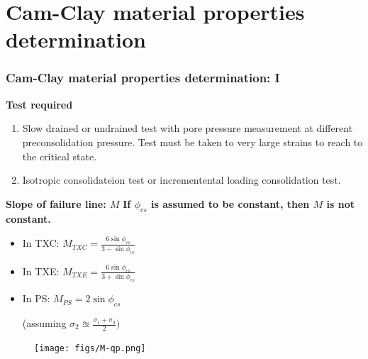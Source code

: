 \documentclass[notes]{beamer}
\begin{document}
\section{Cam-Clay material properties determination}
\begin{frame}
\frametitle{Cam-Clay material properties determination: I}
\textbf{Test required}
\begin{enumerate}
	\item Slow drained or undrained test with pore pressure measurement at different preconsolidation pressure. Test must be taken to very large strains to reach to the critical state.
	\item Isotropic consolidateion test or incrementental loading consolidation test.
\end{enumerate}


\noindent
\fboxsep=0pt
\noindent
\begin{minipage}[t]{0.65\linewidth}
\textbf{Slope of failure line: $M$}
\textbf{If $\phi_{cs}$ is assumed to be constant, then $M$ is not constant.
}
\begin{itemize}
	\item In TXC: $M_{TXC} = \frac{6 \sin \phi_{cs}}{3 - \sin \phi_{cs}}$
	\item In TXE: $M_{TXE} = \frac{6 \sin \phi_{cs}}{3 + \sin \phi_{cs}}$
	\item In PS: $M_{PS} = 2 \sin \phi_{cs}$ 
	
	(assuming $\sigma_2 \approxeq \frac{\sigma_1 + \sigma_3}{2})$
\end{itemize}

\end{minipage}%
\hfill
\begin{minipage}[t]{0.35\linewidth}
	\begin{figure}
		\texttt{[image: figs/M-qp.png]}
	\end{figure}
\end{minipage}	
\end{frame}
\end{document}

